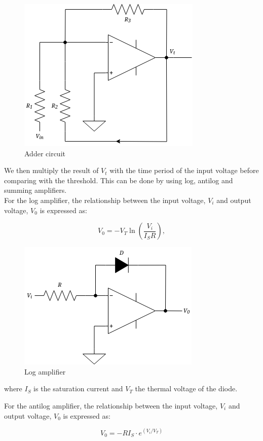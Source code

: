 \documentclass[a4paper, 12pt, oneside]{book}
\begin{document}
\begin{figure}[H]
  \centering
  \includegraphics[scale=0.5]{adder.png}
  \caption{Adder circuit}
\end{figure}

We then multiply the result of $V_t$ with the time period of the input voltage before comparing with the threshold. This can be done by using log, antilog and summing amplifiers.\\

For the log amplifier, the relationship between the input voltage, $V_i$ and output voltage, $V_0$ is expressed as:

\[V_0 = -V_T \ln \left(\frac{V_i}{I_S R}\right),\]

\begin{figure}[H]
  \centering
  \includegraphics[scale=0.5]{log.png}
  \caption{Log amplifier}
\end{figure}

where $I_S$ is the saturation current and $V_T$ the thermal voltage of the diode.

For the antilog amplifier, the relationship between the input voltage, $V_i$ and output voltage, $V_0$ is expressed as:

\[V_0 = -R I_S \cdot e^{(V_i/V_T)}\]
\end{document}
